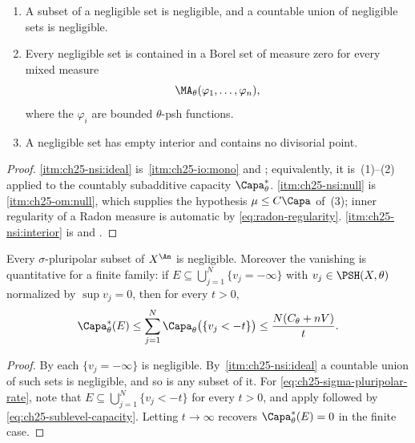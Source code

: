 \begin{proposition}
\label{prop:ch25-negligible-sigma-ideal}
\begin{enumerate}
\item\label{itm:ch25-nsi:ideal}
 A subset of a negligible set is negligible, and a countable union of
 negligible sets is negligible.
\item\label{itm:ch25-nsi:null}
 Every negligible set is contained in a Borel set of measure zero for every
 mixed measure
 \[
  \MA_\theta(\varphi_1,\ldots,\varphi_n),
 \]
 where the $\varphi_i$ are bounded $\theta$-psh functions.
\item\label{itm:ch25-nsi:interior}
 A negligible set has empty interior and contains no divisorial point.
\end{enumerate}
\end{proposition}

\begin{proof}
\cref{itm:ch25-nsi:ideal} is
\,\cref{itm:ch25-io:mono} and
; equivalently, it is
\,(1)--(2) applied to the countably subadditive
capacity $\Capa^*_\theta$.  \cref{itm:ch25-nsi:null} is
\,\cref{itm:ch25-om:null}, which supplies the
hypothesis $\mu\leq C\Capa$ of \,(3);
inner regularity of a Radon measure is automatic by
\eqref{eq:radon-regularity}.  \cref{itm:ch25-nsi:interior} is
 and
.
\end{proof}

\begin{theorem}
\label{thm:ch25-pluripolar-negligible}
Every $\sigma$-pluripolar subset of $X^{\An}$ is negligible.  Moreover
the vanishing is quantitative for a finite family: if
$E\subseteq\bigcup_{j=1}^N\{v_j=-\infty\}$ with
$v_j\in\PSH(X,\theta)$ normalized by $\sup v_j=0$, then for every
$t>0$,
\begin{equation}
\label{eq:ch25-sigma-pluripolar-rate}
 \Capa^*_\theta(E)\leq\sum_{j=1}^N
 \Capa_\theta\bigl(\{v_j<-t\}\bigr)
 \leq\frac{N(C_\theta+nV)}{t}.
\end{equation}
\end{theorem}

\begin{proof}
By  each $\{v_j=-\infty\}$ is negligible.
By \,\cref{itm:ch25-nsi:ideal} a
countable union of such sets is negligible, and so is any subset of it.  For
\eqref{eq:ch25-sigma-pluripolar-rate}, note that
$E\subseteq\bigcup_{j=1}^N\{v_j<-t\}$ for every $t>0$, and apply
 followed by
\eqref{eq:ch25-sublevel-capacity}.  Letting $t\to\infty$ recovers
$\Capa^*_\theta(E)=0$ in the finite case.
\end{proof}

